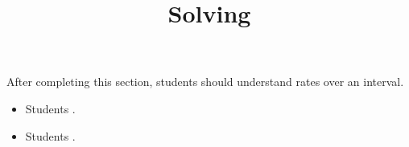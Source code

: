 \documentclass{ximera}
\title{Solving}
\begin{document}
\begin{abstract}
\end{abstract}

\maketitle

\begin{sectionOutcomes}

After completing this section, students should understand rates over an interval. 

\begin{itemize}
\item Students .
\item Students .
\end{itemize}

\end{sectionOutcomes}
\end{document}

